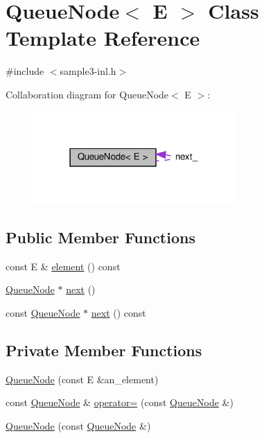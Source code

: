 \hypertarget{classQueueNode}{}\section{Queue\+Node$<$ E $>$ Class Template Reference}
\label{classQueueNode}


{\ttfamily \#include $<$sample3-\/inl.\+h$>$}



Collaboration diagram for Queue\+Node$<$ E $>$\+:\nopagebreak
\begin{figure}[H]
\begin{center}
\leavevmode
\includegraphics[width=219pt]{classQueueNode__coll__graph}
\end{center}
\end{figure}
\subsection*{Public Member Functions}
\begin{DoxyCompactItemize}
\item 
const E \& \hyperlink{classQueueNode_a1c61b3ed32e089f5901b87022ef84985}{element} () const
\item 
\hyperlink{classQueueNode}{Queue\+Node} $\ast$ \hyperlink{classQueueNode_a8a9fdf488da06533360999ef85db56ea}{next} ()
\item 
const \hyperlink{classQueueNode}{Queue\+Node} $\ast$ \hyperlink{classQueueNode_ada477e4f309f29383112dbda473dd985}{next} () const
\end{DoxyCompactItemize}
\subsection*{Private Member Functions}
\begin{DoxyCompactItemize}
\item 
\hyperlink{classQueueNode_a2c22feef35d910bec7138598e8784e25}{Queue\+Node} (const E \&an\+\_\+element)
\item 
const \hyperlink{classQueueNode}{Queue\+Node} \& \hyperlink{classQueueNode_a8635bbe6310e011ef4fcf1a01566dbb7}{operator=} (const \hyperlink{classQueueNode}{Queue\+Node} \&)
\item 
\hyperlink{classQueueNode_a35adcad7a84db46784907cf58106d585}{Queue\+Node} (const \hyperlink{classQueueNode}{Queue\+Node} \&)
\end{DoxyCompactItemize}
